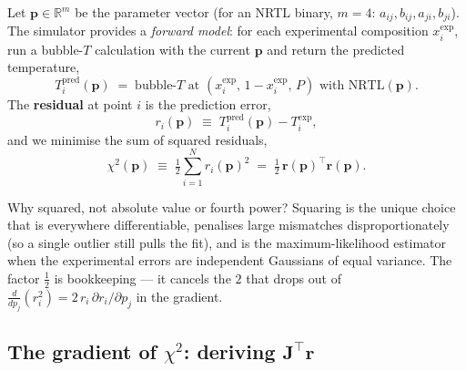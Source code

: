 \documentclass[11pt,a4paper]{article}
\newcommand{\R}{\mathbb{R}}
\newcommand{\Jac}{\mathbf{J}}
\newcommand{\pv}{\mathbf{p}}                          %
\newcommand{\rv}{\mathbf{r}}                          %
\begin{document}
Let $\pv \in \R^m$ be the parameter vector (for an NRTL binary,
$m = 4$: $a_{ij}, b_{ij}, a_{ji}, b_{ji}$). The simulator provides
a \emph{forward model}: for each experimental composition
$x^{\mathrm{exp}}_i$, run a bubble-$T$ calculation with the current
$\pv$ and return the predicted temperature,
\begin{equation}
   T_i^{\mathrm{pred}}(\pv) \;=\; \text{bubble-}T\text{ at }
   (x^{\mathrm{exp}}_i,\,1 - x^{\mathrm{exp}}_i,\,P)\text{ with NRTL}(\pv).
\end{equation}
The \textbf{residual} at point $i$ is the prediction error,
\begin{equation}
   r_i(\pv) \;\equiv\; T_i^{\mathrm{pred}}(\pv) - T_i^{\mathrm{exp}},
\end{equation}
and we minimise the sum of squared residuals,
\begin{equation}
   \boxed{\;
   \chi^2(\pv) \;\equiv\; \tfrac{1}{2}\sum_{i=1}^{N} r_i(\pv)^2
                 \;=\; \tfrac{1}{2}\,\rv(\pv)^{\!\top}\rv(\pv).
   \;}
   \label{eq:chi2}
\end{equation}

\begin{intuition}
Why squared, not absolute value or fourth power? Squaring is the
unique choice that is everywhere differentiable, penalises large
mismatches disproportionately (so a single outlier still pulls the
fit), and is the maximum-likelihood estimator when the experimental
errors are independent Gaussians of equal variance. The factor
$\tfrac{1}{2}$ is bookkeeping --- it cancels the $2$ that drops out
of $\frac{d}{dp_j}(r_i^2) = 2\,r_i\,\partial r_i/\partial p_j$ in
the gradient.
\end{intuition}

\subsection{The gradient of $\chi^2$: deriving $\Jac^{\!\top}\rv$}
\end{document}
